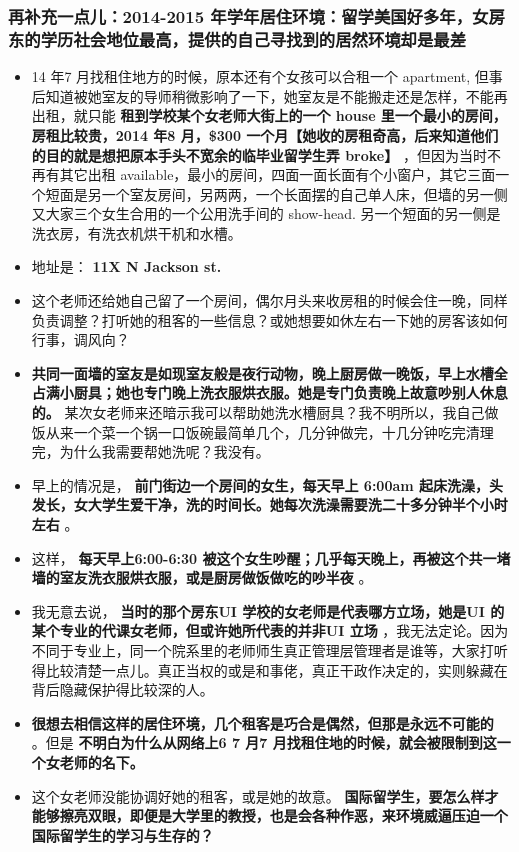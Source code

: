 \documentclass[9pt, b5paper]{article}
\begin{document}
\subsubsection{再补充一点儿：2014-2015 年学年居住环境：留学美国好多年，女房东的学历社会地位最高，提供的自己寻找到的居然环境却是最差}
\label{sec-3-1-4}
\begin{itemize}
\item 14 年7 月找租住地方的时候，原本还有个女孩可以合租一个 apartment, 但事后知道被她室友的导师稍微影响了一下，她室友是不能搬走还是怎样，不能再出租，就只能 \textbf{租到学校某个女老师大街上的一个 house 里一个最小的房间，房租比较贵，2014 年8 月，\$300 一个月【她收的房租奇高，后来知道他们的目的就是想把原本手头不宽余的临毕业留学生弄 broke】} ，但因为当时不再有其它出租 available，最小的房间，四面一面长面有个小窗户，其它三面一个短面是另一个室友房间，另两两，一个长面摆的自己单人床，但墙的另一侧又大家三个女生合用的一个公用洗手间的 show-head. 另一个短面的另一侧是洗衣房，有洗衣机烘干机和水槽。
\item 地址是： \textbf{11X N Jackson st.}
\item 这个老师还给她自己留了一个房间，偶尔月头来收房租的时候会住一晚，同样负责调整？打听她的租客的一些信息？或她想要如休左右一下她的房客该如何行事，调风向？
\item \textbf{共同一面墙的室友是如现室友般是夜行动物，晚上厨房做一晚饭，早上水槽全占满小厨具；她也专门晚上洗衣服烘衣服。她是专门负责晚上故意吵别人休息的。} 某次女老师来还暗示我可以帮助她洗水槽厨具？我不明所以，我自己做饭从来一个菜一个锅一口饭碗最简单几个，几分钟做完，十几分钟吃完清理完，为什么我需要帮她洗呢？我没有。
\item 早上的情况是， \textbf{前门街边一个房间的女生，每天早上 6:00am 起床洗澡，头发长，女大学生爱干净，洗的时间长。她每次洗澡需要洗二十多分钟半个小时左右} 。
\item 这样， \textbf{每天早上6:00-6:30 被这个女生吵醒；几乎每天晚上，再被这个共一堵墙的室友洗衣服烘衣服，或是厨房做饭做吃的吵半夜} 。
\item 我无意去说， \textbf{当时的那个房东UI 学校的女老师是代表哪方立场，她是UI 的某个专业的代课女老师，但或许她所代表的并非UI 立场} ，我无法定论。因为不同于专业上，同一个院系里的老师师生真正管理层管理者是谁等，大家打听得比较清楚一点儿。真正当权的或是和事佬，真正干政作决定的，实则躲藏在背后隐藏保护得比较深的人。
\item \textbf{很想去相信这样的居住环境，几个租客是巧合是偶然，但那是永远不可能的} 。但是 \textbf{不明白为什么从网络上6 7 月7 月找租住地的时候，就会被限制到这一个女老师的名下。}
\item 这个女老师没能协调好她的租客，或是她的故意。 \textbf{国际留学生，要怎么样才能够擦亮双眼，即便是大学里的教授，也是会各种作恶，来环境威逼压迫一个国际留学生的学习与生存的？}

\end{itemize}
\end{document}
